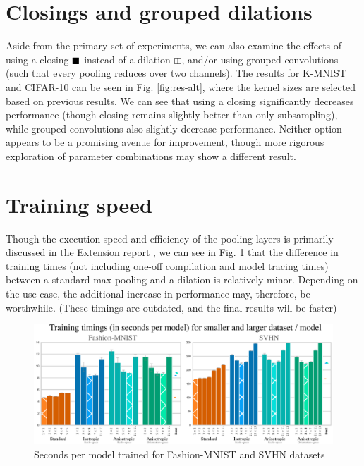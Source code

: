 \documentclass[a4paper, 12pt]{report}
\def\comment#1{\color{red}#1\color{black}}
\DeclareMathOperator{\boxclose}{\vcenter{\hbox{$\blacksquare$}}}
\begin{document}
\section{Closings and grouped dilations}
Aside from the primary set of experiments, we can also examine the effects of using a closing $\boxclose$ instead of a dilation $\boxplus$, and/or using grouped convolutions (such that every pooling reduces over two channels). The results for K-MNIST and CIFAR-10 can be seen in Fig. \ref{fig:res-alt}, where the kernel sizes are selected based on previous results. We can see that using a closing significantly decreases performance (though closing remains slightly better than only subsampling),
while grouped convolutions also slightly decrease performance. Neither option appears to be a promising avenue for improvement, though more rigorous exploration of parameter combinations may show a different result.

\section{Training speed}
Though the execution speed and efficiency of the pooling layers is primarily discussed in the Extension report \cite{extension}, we can see in Fig. \ref{fig:res-timings} that the difference in training times (not including one-off compilation and model tracing times) between a standard max-pooling and a dilation is relatively minor. Depending on the use case, the additional increase in performance may, therefore, be worthwhile.
\comment{(These timings are outdated, and the final results will be faster)}
\begin{figure}[ht!]
	\center
  \includegraphics[width=1\textwidth]{figures/timings.png}
  \caption{Seconds per model trained for Fashion-MNIST and SVHN datasets}
  \label{fig:res-timings}
\end{figure}
\end{document}
